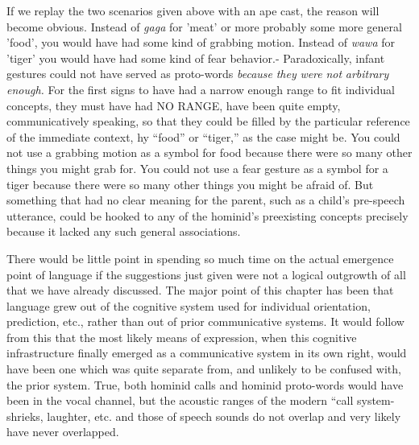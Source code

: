 If we replay the two scenarios given above with an ape cast, the reason will become obvious. Instead of \textit{gaga} for 'meat' or more prob\-ably some more general 'food', you would have had some kind of grabbing motion. Instead of \textit{wawa} for 'tiger' you would have had some kind of fear behavior.- Paradoxically, infant gestures could not have served as proto-words \textit{because} \textit{they} \textit{were} \textit{not} \textit{arbitrary} \textit{enough.} For the first signs to have had a narrow enough range to fit individual concepts, they must have had NO RANGE, have been quite empty, communi\-catively speaking, so that they could be filled by the particular refer\-ence of the immediate context, hy ``food'' or ``tiger,'' as the case might be. You could not use a grabbing motion as a symbol for food because there were so many other things you might grab for. You could not use a fear gesture as a symbol for a tiger because there were so many other things you might be afraid of. But something that had no clear meaning for the parent, such as a child's pre-speech utterance, could be hooked to any of the hominid's preexisting concepts precisely because it lacked any such general associations.

There would be little point in spending so much time on the actual emergence point of language if the suggestions just given were not a logical outgrowth of all that we have already discussed. The major point of this chapter has been that language grew out of the cognitive system used for individual orientation, prediction, etc., rather than out of prior communicative systems. It would follow from this that the most likely means of expression, when this cognitive infra\-structure finally emerged as a communicative system in its own right, would have been one which was quite separate from, and unlikely to be confused with, the prior system. True, both hominid calls and hominid proto-words would have been in the vocal channel, but the acoustic ranges of the modern ``call system{\textquotedbl}-shrieks, laughter, etc.\-
and those of speech sounds do not overlap and very likely have never overlapped.


